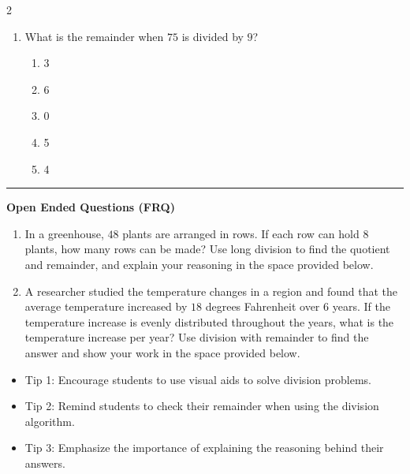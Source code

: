 \documentclass[10pt]{article}
\begin{document}
\begin{multicols}{2}
\begin{enumerate}[label=\textbf{Q\arabic*.}, leftmargin=*, itemsep=6pt, parsep=0pt]
  \item \small What is the remainder when $75$ is divided by $9$?
  \begin{enumerate}[label=(\Alph*), leftmargin=0.6cm, nosep, itemsep=2pt]
    \item 3
    \item 6
    \item 0
    \item 5
    \item 4
  \end{enumerate}

\end{enumerate}
\end{multicols}

\vspace{-0.2cm}
\hrule
\vspace{0.2cm}
\textbf{\small Open Ended Questions (FRQ)}
\begin{enumerate}[label=\textbf{Q\arabic*.}, start=9, itemsep=5pt, topsep=0pt]

  \item \small In a greenhouse, $48$ plants are arranged in rows. If each row can hold $8$ plants, how many rows can be made? Use long division to find the quotient and remainder, and explain your reasoning in the space provided below. \vspace{2cm}

  \item \small A researcher studied the temperature changes in a region and found that the average temperature increased by $18$ degrees Fahrenheit over $6$ years. If the temperature increase is evenly distributed throughout the years, what is the temperature increase per year? Use division with remainder to find the answer and show your work in the space provided below. \vspace{2cm}

\end{enumerate}

\vfill

\begin{tcolorbox}[colback=blue!5, colframe=mainblue!50, title=\small \textbf{Chef's Tips}, fonttitle=\bfseries, bottom=1mm]
\begin{itemize}[noitemsep, topsep=2pt, leftmargin=0.5cm]
  \item \scriptsize Tip 1: Encourage students to use visual aids to solve division problems.\item \scriptsize Tip 2: Remind students to check their remainder when using the division algorithm.\item \scriptsize Tip 3: Emphasize the importance of explaining the reasoning behind their answers.
\end{itemize}
\end{tcolorbox}
\end{document}
